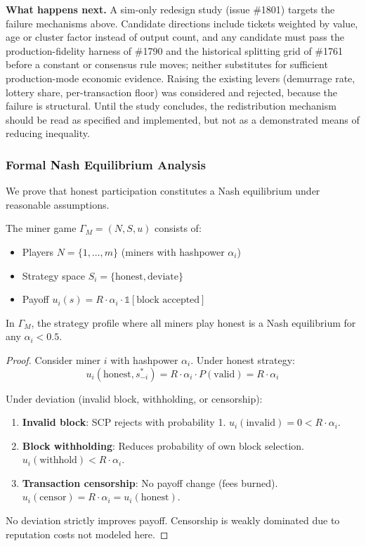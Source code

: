 \textbf{What happens next.} A sim-only redesign study (issue \#1801) targets
the failure mechanisms above. Candidate directions include tickets weighted
by value, age or cluster factor instead of output count, and any candidate
must pass the production-fidelity harness of \#1790 and the historical
splitting grid of \#1761 before a constant or consensus rule moves; neither
substitutes for sufficient production-mode economic evidence. Raising the existing levers
(demurrage rate, lottery share, per-transaction floor) was considered and
rejected, because the failure is structural. Until the study concludes, the
redistribution mechanism should be read as specified and implemented, but not
as a demonstrated means of reducing inequality.

\subsubsection{Formal Nash Equilibrium Analysis}

We prove that honest participation constitutes a Nash equilibrium under
reasonable assumptions.

\begin{definition}
The miner game $\Gamma_M = (N, S, u)$ consists of:
\begin{itemize}
  \item Players $N = \{1, \ldots, m\}$ (miners with hashpower $\alpha_i$)
  \item Strategy space $S_i = \{\text{honest}, \text{deviate}\}$
  \item Payoff $u_i(s) = R \cdot \alpha_i \cdot \mathbb{1}[\text{block accepted}]$
\end{itemize}
\end{definition}

\begin{theorem}
In $\Gamma_M$, the strategy profile where all miners play honest is a Nash
equilibrium for any $\alpha_i < 0.5$.
\end{theorem}

\begin{proof}
Consider miner $i$ with hashpower $\alpha_i$. Under honest strategy:
\[
u_i(\text{honest}, s_{-i}^*) = R \cdot \alpha_i \cdot P(\text{valid}) = R \cdot \alpha_i
\]

Under deviation (invalid block, withholding, or censorship):
\begin{enumerate}
  \item \textbf{Invalid block}: SCP rejects with probability 1.
    $u_i(\text{invalid}) = 0 < R \cdot \alpha_i$.
  \item \textbf{Block withholding}: Reduces probability of own block
    selection. $u_i(\text{withhold}) < R \cdot \alpha_i$.
  \item \textbf{Transaction censorship}: No payoff change (fees burned).
    $u_i(\text{censor}) = R \cdot \alpha_i = u_i(\text{honest})$.
\end{enumerate}

No deviation strictly improves payoff. Censorship is weakly dominated
due to reputation costs not modeled here.
\end{proof}

